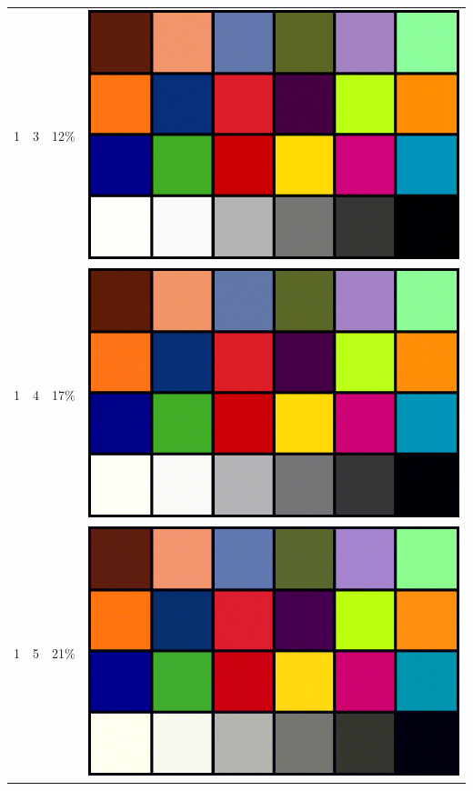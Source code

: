 \documentclass[times, utf8, seminar]{fer}
\begin{document}
\begin{center}
\begin{longtable}{|c|c|c|c|}
1 & 3 &12\% & \includegraphics[scale=0.3]{../benchmark_results/color_chart/1_components-3_bits.png} \\
1 & 4 &17\% & \includegraphics[scale=0.3]{../benchmark_results/color_chart/1_components-4_bits.png} \\
1 & 5 &21\% & \includegraphics[scale=0.3]{../benchmark_results/color_chart/1_components-5_bits.png} \\

\end{longtable}
\end{center}
\end{document}
